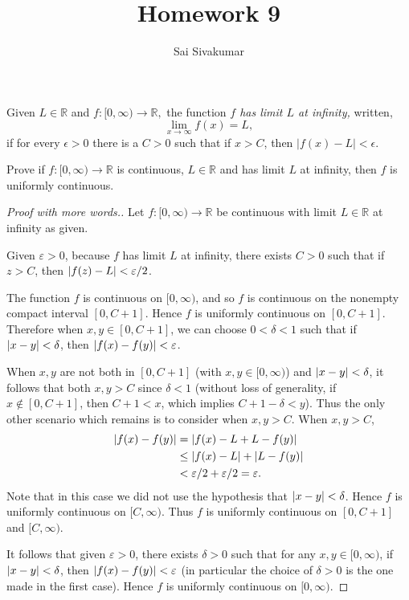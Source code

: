 \documentclass[11pt]{amsart}
\title{Homework 9}
\author{Sai Sivakumar}
\begin{document}
 Given $L\in \mathbb{R}$  and  $f:[0,\infty)\to \mathbb{R},$
  the function  \emph{$f$ has limit $L$ at infinity,}   written,
 \begin{equation*}
   \lim_{x\to \infty}f(x)=L,
 \end{equation*}
  if for every $\epsilon>0$ there is a $C>0$ such that
  if $x>C$, then $|f(x)-L| <\epsilon.$

  Prove if $f:[0,\infty)\to \mathbb{R}$ is continuous, $L\in \mathbb{R}$  and has
  limit $L$  at infinity, then $f$ is uniformly continuous.

\begin{proof}[Proof with more words.]
    Let $f\colon [0,\infty)\to \mathbb{R}$ be continuous with limit $L\in \mathbb{R}$ at infinity as given.

    Given $\varepsilon>0$, because $f$ has limit $L$ at infinity, there exists $C>0$ such that if $z>C$, then $\abs{f(z)-L}< \varepsilon/2$.

    The function $f$ is continuous on $[0,\infty)$, and so $f$ is continuous on the nonempty compact interval $[0,C+1]$. Hence $f$ is uniformly continuous on $[0,C+1]$. Therefore when $x,y\in[0,C+1]$, we can choose $0 < \delta < 1$ such that if $\abs{x-y}< \delta$, then $\abs{f(x)-f(y)}< \varepsilon$.

    When $x,y$ are not both in $[0,C+1]$ (with $x,y\in [0,\infty)$) and $\abs{x-y}<\delta$, it follows that both $x,y > C$ since $\delta < 1$ (without loss of generality, if $x\not\in [0,C+1]$, then $C+1< x$, which implies $C+1-\delta < y$). Thus the only other scenario which remains is to consider when $x,y > C$. When $x,y>C$, \begin{align*}
        \abs{f(x)-f(y)} &= \abs{f(x)-L+L-f(y)}\\
        &\leq \abs{f(x)-L} + \abs{L-f(y)}\\
        &< \varepsilon/2 + \varepsilon/2 = \varepsilon.
    \end{align*} Note that in this case we did not use the hypothesis that $\abs{x-y}< \delta$. Hence $f$ is uniformly continuous on $[C,\infty)$. Thus $f$ is uniformly continuous on $[0,C+1]$ and $[C,\infty)$.
    
    It follows that given $\varepsilon>0$, there exists $\delta >0$ such that for any $x,y\in [0,\infty)$, if $\abs{x-y}< \delta$, then $\abs{f(x)-f(y)} < \varepsilon$ (in particular the choice of $\delta>0$ is the one made in the first case). Hence $f$ is uniformly continuous on $[0,\infty)$.
\end{proof}
\end{document}
